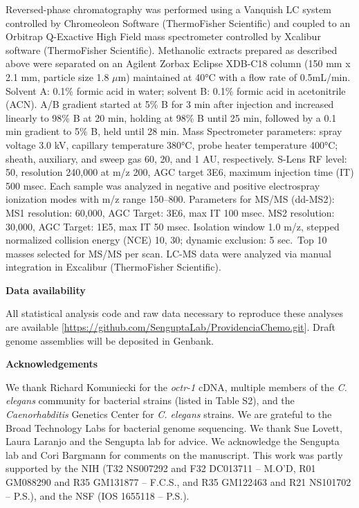 \documentclass[11pt,]{article}
\begin{document}
Reversed-phase chromatography was performed using a Vanquish LC system
controlled by Chromeoleon Software (ThermoFisher Scientific) and coupled
to an Orbitrap Q-Exactive High Field mass spectrometer controlled by
Xcalibur software (ThermoFisher Scientific). Methanolic extracts
prepared as described above were separated on an Agilent Zorbax Eclipse
XDB-C18 column (150 mm x 2.1 mm, particle size 1.8 \(\mu\)m) maintained
at 40°C with a flow rate of 0.5mL/min. Solvent A: 0.1\% formic acid in
water; solvent B: 0.1\% formic acid in acetonitrile (ACN). A/B gradient
started at 5\% B for 3 min after injection and increased linearly to
98\% B at 20 min, holding at 98\% B until 25 min, followed by a 0.1 min
gradient to 5\% B, held until 28 min. Mass Spectrometer parameters:
spray voltage 3.0 kV, capillary temperature 380°C, probe heater
temperature 400°C; sheath, auxiliary, and sweep gas 60, 20, and 1 AU,
respectively. S-Lens RF level: 50, resolution 240,000 at m/z 200, AGC
target 3E6, maximum injection time (IT) 500 msec. Each sample was
analyzed in negative and positive electrospray ionization modes with m/z
range 150--800. Parameters for MS/MS (dd-MS2): MS1 resolution: 60,000,
AGC Target: 3E6, max IT 100 msec. MS2 resolution: 30,000, AGC Target:
1E5, max IT 50 msec. Isolation window 1.0 m/z, stepped normalized
collision energy (NCE) 10, 30; dynamic exclusion: 5 sec.~Top 10 masses
selected for MS/MS per scan. LC-MS data were analyzed via manual
integration in Excalibur (ThermoFisher Scientific).

\vspace{2\parsep}

\noindent \textbf{Data availability}

All statistical analysis code and raw data necessary to reproduce these
analyses are available
{[}\url{https://github.com/SenguptaLab/ProvidenciaChemo.git}{]}. Draft
genome assemblies will be deposited in Genbank.

\vspace{2\parsep}

\begin{center}
\textbf{Acknowledgements}
\end{center}

\noindent We thank Richard Komuniecki for the \emph{octr-1} cDNA,
multiple members of the \emph{C. elegans} community for bacterial
strains (listed in Table S2), and the \emph{Caenorhabditis} Genetics
Center for \emph{C. elegans} strains. We are grateful to the Broad
Technology Labs for bacterial genome sequencing. We thank Sue Lovett,
Laura Laranjo and the Sengupta lab for advice. We acknowledge the
Sengupta lab and Cori Bargmann for comments on the manuscript. This work
was partly supported by the NIH (T32 NS007292 and F32 DC013711 -- M.O'D,
R01 GM088290 and R35 GM131877 -- F.C.S., and R35 GM122463 and R21
NS101702 -- P.S.), and the NSF (IOS 1655118 -- P.S.).
\end{document}

